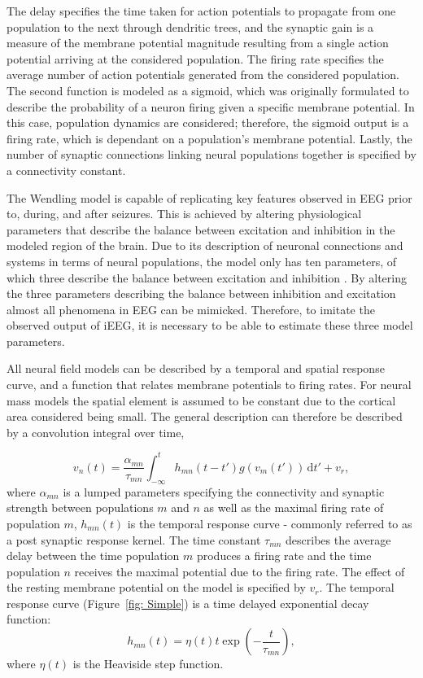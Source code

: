  The delay specifies the time taken for action potentials to propagate from one population to the next through dendritic trees, and the synaptic gain is a measure of the membrane potential magnitude resulting from a single action potential arriving at the considered population.
The firing rate specifies the average number of action potentials generated from the considered population. The second function is modeled as a sigmoid, which was originally formulated to describe the probability of a neuron firing given a specific membrane potential. In this case, population dynamics are considered; therefore, the sigmoid output is a firing rate, which is dependant on a population's membrane potential. Lastly, the number of synaptic connections linking neural populations together is specified by a connectivity constant.

The Wendling model is capable of replicating key features observed in EEG prior to, during, and after seizures. This is achieved by altering physiological parameters that describe the balance between excitation and inhibition in the modeled region of the brain. Due to its description of neuronal connections and systems in terms of neural populations, the model only has ten parameters, of which three describe the balance between excitation and inhibition \citep{wendling2002epileptic}. By altering the three parameters describing the balance between inhibition and excitation almost all phenomena in EEG can be mimicked. Therefore, to imitate the observed output of iEEG, it is necessary to be able to estimate these three model parameters.
 

All neural field models can be described by a temporal and spatial response curve, and a function that relates membrane potentials to firing rates. For neural mass models the spatial element is assumed to be constant due to the cortical area considered being small. The general description can therefore be described by a convolution integral over time,

\begin{equation}\label{eq:conv_eq}
    v_n(t) = \frac{\alpha_{mn}}{\tau_{mn}}\int_{-\infty}^t  h_{mn}(t-t')g(v_m(t')) \,\mathrm{d}t' + v_r,
\end{equation}
where $\alpha_{mn}$ is a lumped parameters specifying the connectivity and synaptic strength between populations $m$ and $n$ as well as the maximal firing rate of population $m$, $h_{mn}(t)$ is the temporal response curve - commonly referred to as a post synaptic response kernel. The time constant $\tau_{mn}$  describes the average delay between the time population $m$ produces a firing rate and the time population $n$ receives the maximal potential due to the firing rate. The effect of the resting membrane potential on the model is specified by $v_r$. The temporal response curve (Figure~\ref{fig: Simple}) is a time delayed exponential decay function:
\begin{equation}
    h_{mn}(t) = \eta(t)t\exp\left(-\frac{t}{\tau_{mn}}\right),
\end{equation}
where $\eta(t)$ is the Heaviside step function. 

